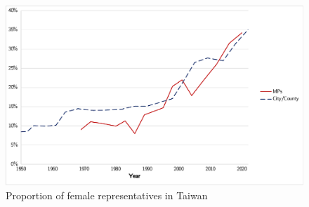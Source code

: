 \begin{figure}[]
    
    \includegraphics[width=0.8\columnwidth]{figures/proportion-of-female-representatives.pdf}
    
    \caption{Proportion of female representatives in Taiwan}
    \label{fig:proportion-of-female-representatives}

\end{figure}